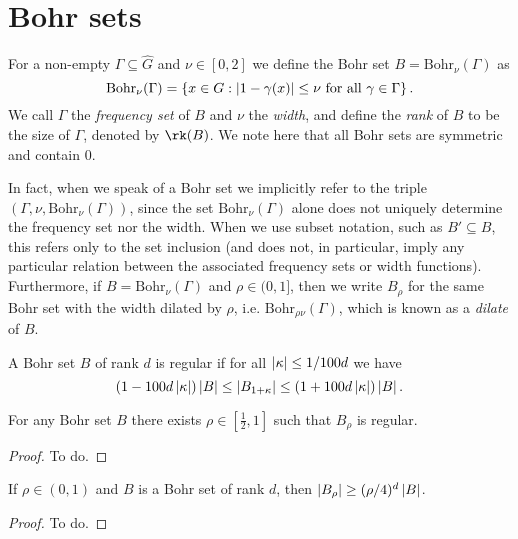 \chapter{Bohr sets}

\begin{definition}
\label{bohr-set}
For a non-empty $\Gamma\subseteq \widehat{G}$ and $\nu\in [0,2]$ we define the Bohr set $B=\mathrm{Bohr}_\nu(\Gamma)$ as
\[\mathrm{Bohr}_\nu(\Gamma)=\left\{ x\in G : \left\lvert 1-\gamma(x)\right\rvert\leq \nu\textrm{ for all }\gamma\in\Gamma\right\}.\]
We call $\Gamma$ the \emph{frequency set} of $B$ and $\nu$ the \emph{width}, and define the \emph{rank} of $B$ to be the size of $\Gamma$, denoted by $\rk(B)$. We note here that all Bohr sets are symmetric and contain $0$.

In fact, when we speak of a Bohr set we implicitly refer to the triple $(\Gamma,\nu,\mathrm{Bohr}_\nu(\Gamma))$, since the set $\mathrm{Bohr}_{\nu}(\Gamma)$ alone does not uniquely determine the frequency set nor the width. When we use subset notation, such as $B'\subseteq B$, this refers only to the set inclusion (and does not, in particular, imply any particular relation between the associated frequency sets or width functions). Furthermore, if $B=\mathrm{Bohr}_\nu(\Gamma)$ and $\rho\in(0,1]$, then we write $B_\rho$ for the same Bohr set with the width dilated by $\rho$, i.e. $\mathrm{Bohr}_{\rho\nu}(\Gamma)$, which is known as a \emph{dilate} of $B$.
\end{definition}

\begin{definition}[Regularity]
\label{bohr-reg-def}
A Bohr set $B$ of rank $d$ is regular if for all $\left\lvert \kappa\right\rvert\leq 1/100d$ we have
\[(1-100 d\left\lvert \kappa\right\rvert)\left\lvert B\right\rvert\leq \left\lvert B_{1+\kappa}\right\rvert\leq(1+ 100 d\left\lvert \kappa\right\rvert)\left\lvert B\right\rvert.\]
\end{definition}

\begin{lemma}
\label{bohr-regularity}
For any Bohr set $B$ there exists $\rho\in[\tfrac{1}{2},1]$ such that $B_\rho$ is regular.
\end{lemma}
\begin{proof}
To do.
\end{proof}

\begin{lemma}
\label{bohr-size}
If $\rho\in (0,1)$ and $B$ is a Bohr set of rank $d$, then $\left\lvert B_\rho\right\rvert\geq (\rho/4)^d\left\lvert B\right\rvert$.
\end{lemma}
\begin{proof}
To do.
\end{proof}

